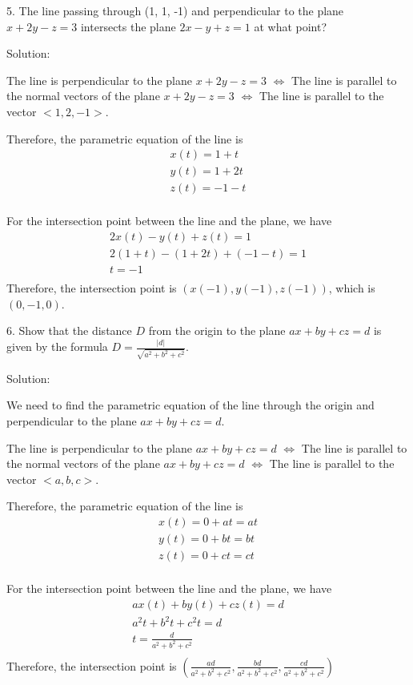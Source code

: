 \documentclass{article}
\begin{document}
5. The line passing through (1, 1, -1) and perpendicular to the plane 
$x + 2y - z = 3$ intersects the plane $2x - y + z = 1$ at what point?

Solution:

The line is perpendicular to the plane $x + 2y - z = 3$ 
$\iff$ The line is parallel to the normal vectors of the plane $x + 2y - z = 3$
$\iff$ The line is parallel to the vector $<1, 2, -1>$.

Therefore, the parametric equation of the line is
\begin{gather*}
  x(t) = 1 + t \\
  y(t) = 1 + 2t \\
  z(t) = -1 - t \\
\end{gather*}

For the intersection point between the line and the plane, we have
\begin{gather*}
  2x(t) - y(t) + z(t) = 1 \\
  2(1 + t) - (1 + 2t) + (-1 - t) = 1 \\
  t = -1 \\
\end{gather*}
Therefore, the intersection point is $(x(-1), y(-1), z(-1))$, which is 
$(0, -1, 0)$.

6. Show that the distance $D$ from the origin to the plane $ax + by + cz = d$ is 
given by the formula $D = \frac{|d|}{\sqrt{a^2 + b^2 + c^2}}$.

Solution:

We need to find the parametric equation of the line through the origin and 
perpendicular to the plane $ax + by + cz = d$.

The line is perpendicular to the plane $ax + by + cz = d$ 
$\iff$ The line is parallel to the normal vectors of the plane $ax + by + cz = d$
$\iff$ The line is parallel to the vector $<a, b, c>$.

Therefore, the parametric equation of the line is
\begin{gather*}
  x(t) = 0 + at = at \\
  y(t) = 0 + bt = bt \\
  z(t) = 0 + ct = ct \\
\end{gather*}

For the intersection point between the line and the plane, we have
\begin{gather*}
  ax(t) + by(t) + cz(t) = d \\
  a^2t + b^2t + c^2t = d \\
  t = \frac{d}{a^2 + b^2 + c^2} \\
\end{gather*}
Therefore, the intersection point is 
$(\frac{ad}{a^2 + b^2 + c^2}, \frac{bd}{a^2 + b^2 + c^2}, \frac{cd}{a^2 + b^2 + c^2})$
\end{document}
